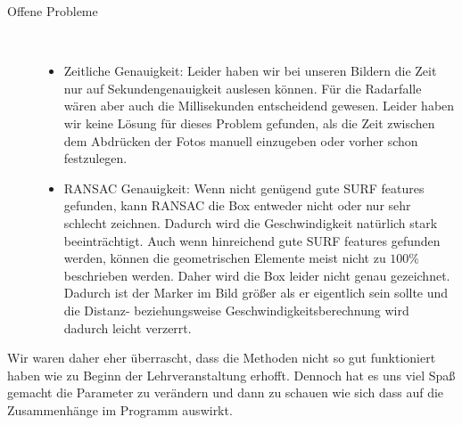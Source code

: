 \documentclass[deutsch]{scrartcl}
\begin{document}
\begin{description}
	\item[Offene Probleme] ~\par
	\begin{itemize}
		\item Zeitliche Genauigkeit: Leider haben wir bei unseren Bildern die Zeit nur auf Sekundengenauigkeit auslesen können. Für die Radarfalle wären aber auch die Millisekunden entscheidend gewesen. Leider haben wir keine Lösung für dieses Problem gefunden, als die Zeit zwischen dem Abdrücken der Fotos manuell einzugeben oder vorher schon festzulegen.
		\item RANSAC Genauigkeit: Wenn nicht genügend gute SURF features gefunden, kann RANSAC die Box entweder nicht oder nur sehr schlecht zeichnen. Dadurch wird die Geschwindigkeit natürlich stark beeinträchtigt. Auch wenn hinreichend gute SURF features gefunden werden, können die geometrischen Elemente meist nicht zu $100\%$ beschrieben werden. Daher wird die Box leider nicht genau gezeichnet. Dadurch ist der Marker im Bild größer als er eigentlich sein sollte und die Distanz- beziehungsweise Geschwindigkeitsberechnung wird dadurch leicht verzerrt.
	\end{itemize}
\end{description}

Wir waren daher eher überrascht, dass die Methoden nicht so gut funktioniert haben wie zu Beginn der Lehrveranstaltung erhofft. Dennoch hat es uns viel Spaß gemacht die Parameter zu verändern und dann zu schauen wie sich dass auf die Zusammenhänge im Programm auswirkt.  




\nocite{*}

\end{document}
